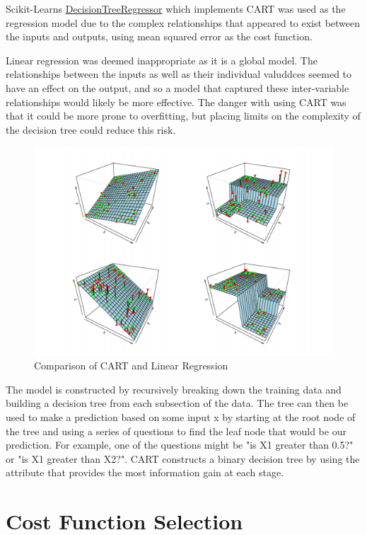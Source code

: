 \documentclass[12pt]{article}
\begin{document}
Scikit-Learns \url{DecisionTreeRegressor} \cite{scikitlearntree} which implements CART was used as the regression model due to the complex relationships that appeared to exist between the inputs and outputs, using mean squared error as the cost function.

Linear regression was deemed inappropriate as it is a global model. The relationships between the inputs as well as their individual valuddces seemed to have an effect on the output, and so a model that captured these inter-variable relationships would likely be more effective. The danger with using CART was that it could be more prone to overfitting, but placing limits on the complexity of the decision tree could reduce this risk. 

\begin{figure}[!ht]
\centering
\includegraphics[width=0.8 \linewidth]{images/cartvslinear}
\caption{Comparison of CART and Linear Regression \cite{breiman}}
\label{fig:cartvslinear}
\end{figure}

The model is constructed by recursively breaking down the training data and building a decision tree from each subsection of the data. The tree can then be used to make a prediction based on some input x by starting at the root node of the tree and using a series of questions to find the leaf node that would be our prediction. For example, one of the questions might be "is X1 greater than 0.5?" or "is X1 greater than X2?". CART constructs a binary decision tree by using the attribute that provides the most information gain at each stage.

\section{Cost Function Selection}
\end{document}
